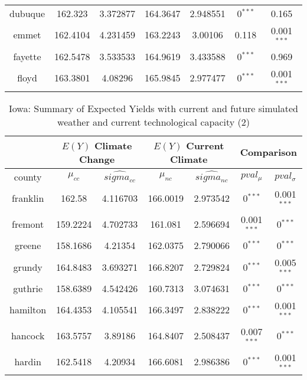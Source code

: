 \begin{table}[]
\begin{tabular}{|c|cc|cc|cc|}
dubuque       & 162.323   & 3.372877          & 164.3647  & 2.948551          & 0$^{***}$     & 0.165                         \\
emmet         & 162.4104  & 4.231459          & 163.2243  & 3.00106           & 0.118                         & 0.001$^{***}$ \\
fayette       & 162.5478  & 3.533533          & 164.9619  & 3.433588          & 0$^{***}$     & 0.969                         \\
floyd         & 163.3801  & 4.08296           & 165.9845  & 2.977477          & 0$^{***}$     & 0.001$^{***}$ \\

\hline
\end{tabular}
\end{table}

\begin{table}[]
\caption{Iowa: Summary of Expected Yields with current and future simulated weather and current technological capacity (2)}
\label{my-label}
\begin{tabular}{|c|cc|cc|cc|}
\hline
\multicolumn{1}{|c}{} & \multicolumn{2}{|c}{$E(Y)$ Climate Change} & \multicolumn{2}{|c}{$E(Y)$ Current Climate} & \multicolumn{2}{|c|}{Comparison}\\ 
\hline
county        & $\mu_{cc}$ & $\hat{sigma_{cc}}$ & $\mu_{nc}$ & $\hat{sigma_{nc}}$ & $pval_{\mu}$ & $pval_{\sigma}$ \\
\hline
franklin      & 162.58    & 4.116703          & 166.0019  & 2.973542          & 0$^{***}$     & 0.001$^{***}$ \\
fremont       & 159.2224  & 4.702733          & 161.081   & 2.596694          & 0.001$^{***}$ & 0$^{***}$     \\
greene        & 158.1686  & 4.21354           & 162.0375  & 2.790066          & 0$^{***}$     & 0$^{***}$     \\
grundy        & 164.8483  & 3.693271          & 166.8207  & 2.729824          & 0$^{***}$     & 0.005$^{***}$ \\
guthrie       & 158.6389  & 4.542426          & 160.7313  & 3.074631          & 0$^{***}$     & 0$^{***}$     \\
hamilton      & 164.4353  & 4.105541          & 166.3497  & 2.838222          & 0$^{***}$     & 0.001$^{***}$ \\
hancock       & 163.5757  & 3.89186           & 164.8407  & 2.508437          & 0.007$^{***}$ & 0$^{***}$     \\
hardin        & 162.5418  & 4.20934           & 166.6081  & 2.986386          & 0$^{***}$     & 0.001$^{***}$ \\

\end{tabular}
\end{table}
